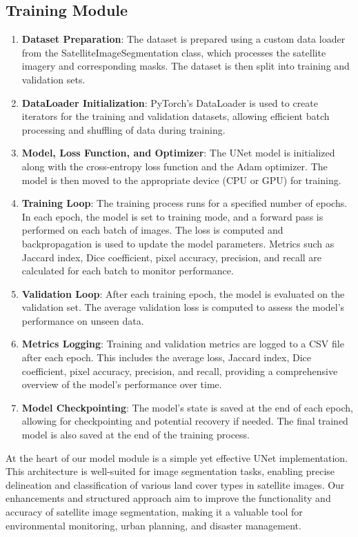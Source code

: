 \documentclass{article}
\begin{document}
\subsection{Training Module}
\begin{enumerate}
    \item \textbf{Dataset Preparation}: The dataset is prepared using a custom data loader from the SatelliteImageSegmentation class, which processes the satellite imagery and corresponding masks. The dataset is then split into training and validation sets.
    \item \textbf{DataLoader Initialization}: PyTorch's DataLoader is used to create iterators for the training and validation datasets, allowing efficient batch processing and shuffling of data during training.
    \item \textbf{Model, Loss Function, and Optimizer}: The UNet model is initialized along with the cross-entropy loss function and the Adam optimizer. The model is then moved to the appropriate device (CPU or GPU) for training.
    \item \textbf{Training Loop}: The training process runs for a specified number of epochs. In each epoch, the model is set to training mode, and a forward pass is performed on each batch of images. The loss is computed and backpropagation is used to update the model parameters. Metrics such as Jaccard index, Dice coefficient, pixel accuracy, precision, and recall are calculated for each batch to monitor performance.
    \item \textbf{Validation Loop}: After each training epoch, the model is evaluated on the validation set. The average validation loss is computed to assess the model's performance on unseen data.
    \item \textbf{Metrics Logging}: Training and validation metrics are logged to a CSV file after each epoch. This includes the average loss, Jaccard index, Dice coefficient, pixel accuracy, precision, and recall, providing a comprehensive overview of the model's performance over time.
    \item \textbf{Model Checkpointing}: The model's state is saved at the end of each epoch, allowing for checkpointing and potential recovery if needed. The final trained model is also saved at the end of the training process.
\end{enumerate}

At the heart of our model module is a simple yet effective UNet implementation. This architecture is well-suited for image segmentation tasks, enabling precise delineation and classification of various land cover types in satellite images. Our enhancements and structured approach aim to improve the functionality and accuracy of satellite image segmentation, making it a valuable tool for environmental monitoring, urban planning, and disaster management.
\end{document}
